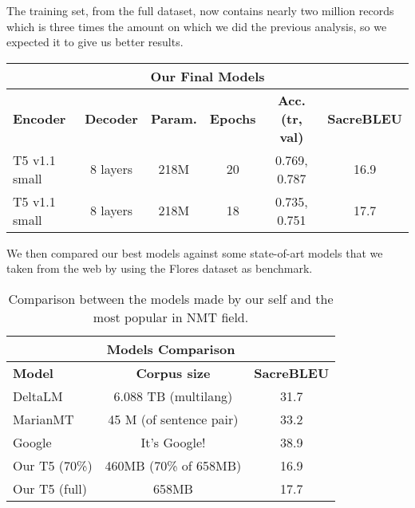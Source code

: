 The training set, from the full dataset, now contains nearly two million records which is three times the amount on which we did the previous analysis, so we expected it to give us better results.

\begin{table}[H]
\centering
\begin{tabular}{l|c|c|c|c|c}\hline \hline
\multicolumn{6}{c}{\textbf{Our Final Models}} \\\hline
\textbf{Encoder} & \textbf{Decoder} & \textbf{Param.} & \textbf{Epochs} & \textbf{Acc. (tr, val)} & \textbf{SacreBLEU}\\\hline
T5 v1.1 small & 8 layers & 218M & 20 & 0.769, 0.787 & 16.9\\
T5 v1.1 small & 8 layers & 218M & 18 & 0.735, 0.751 & 17.7\\\hline \hline 
\end{tabular}
\end{table}
We then compared our best models against some state-of-art models that we taken from the web by using the Flores dataset as benchmark.
\begin{table}[H]
\centering
\begin{tabular}{l|c|c}\hline \hline
\multicolumn{3}{c}{\textbf{Models Comparison}} \\\hline
\textbf{Model} & \multicolumn{1}{c|}{\textbf{Corpus size}} & \multicolumn{1}{c}{\textbf{SacreBLEU}}\\\hline
DeltaLM & 6.088 TB (multilang) & 31.7 \\
MarianMT & 45 M (of sentence pair) & 33.2 \\
Google & It's Google! & 38.9\\
Our T5 (70\%) & 460MB (70\% of 658MB) & 16.9 \\
Our T5 (full) & 658MB & 17.7 \\
\hline \hline
\end{tabular}
\label{table:final_comparison}
\caption{Comparison between the models made by our self and the most popular in NMT field.}
\end{table}

